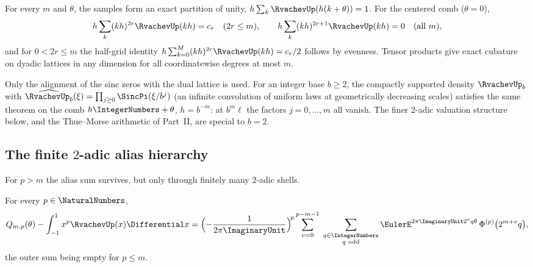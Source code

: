 \documentclass[11pt,oneside]{article}
\numberwithin{equation}{section}
\theoremstyle{definition}
\theoremstyle{remark}
\begin{document}
\begin{corollary}
\label{cor:up-exact-specials}
For every $m$ and $\theta$, the samples form an exact partition of
unity, $h\sum_k\RvachevUp(h(k+\theta))=1$.  For the centered comb
($\theta=0$),
\begin{equation}
 h\sum_{k}(kh)^{2r}\RvachevUp(kh)=c_r\quad(2r\le m),
 \qquad
 h\sum_{k}(kh)^{2r+1}\RvachevUp(kh)=0\quad(\text{all }m),
 \label{eq:centered-moments}
\end{equation}
and for $0<2r\le m$ the half-grid identity
$h\sum_{k=0}^{M}(kh)^{2r}\RvachevUp(kh)=c_r/2$ follows by evenness.
Tensor products give exact cubature on dyadic lattices in any
dimension for all coordinatewise degrees at most $m$.
\end{corollary}

\begin{remark}
\label{rem:base-b}
Only the alignment of the sinc zeros with the dual lattice is used.
For an integer base $b\ge2$, the compactly supported density $\RvachevUp_b$
with $\widehat{\RvachevUp_b}(\xi)=\prod_{j\ge0}\SincPi(\xi/b^{j})$ (an
infinite convolution of uniform laws at geometrically decreasing
scales) satisfies the same theorem on the comb $h\IntegerNumbers+\theta$,
$h=b^{-m}$: at $b^{m}\ell$ the factors $j=0,\dots,m$ all vanish.  The
finer $2$-adic valuation structure below, and the Thue--Morse
arithmetic of Part~II, are special to $b=2$.
\end{remark}

\subsection{The finite \texorpdfstring{$2$}{2}-adic alias hierarchy}

For $p>m$ the alias sum survives, but only through finitely many
$2$-adic shells.

\begin{proposition}
\label{prop:alias-layers}
For every $p\in\NaturalNumbers$,
\begin{equation}
 Q_{m,p}(\theta)-\int_{-1}^{1}x^{p}\RvachevUp(x)\Differential x
 =\Bigl(-\frac{1}{2\pi\ImaginaryUnit}\Bigr)^{\!p}
 \sum_{v=0}^{p-m-1}\;
 \sum_{\substack{q\in\IntegerNumbers\\ q\ \mathrm{odd}}}
 \EulerE^{2\pi\ImaginaryUnit2^{v}q\theta}\,
 \Phi^{(p)}\bigl(2^{m+v}q\bigr),
 \label{eq:alias-layers}
\end{equation}
the outer sum being empty for $p\le m$.
\end{proposition}
\end{document}
